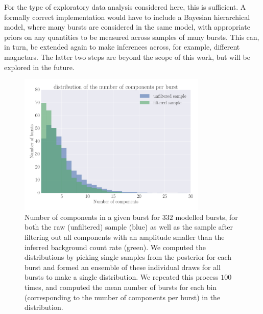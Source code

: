 \documentclass[12pt]{emulateapj}
\begin{document}
For the type of exploratory data analysis considered here, this is sufficient. A formally correct implementation would have to include a Bayesian hierarchical model,
where many bursts are considered in the same model, with appropriate priors on any quantities to be measured across samples of many bursts. This can, in turn,
be extended again to make inferences across, for example, different magnetars. The latter two steps are beyond the scope of this work, but will be explored in the future.


\begin{figure}[htbp]
\begin{center}
\includegraphics[width=9cm]{f4.pdf}%
\caption{Number of components in a given burst for $332$ modelled bursts, for both the raw (unfiltered) sample (blue) as well as the sample after
filtering out all components with an amplitude smaller than the inferred background count rate (green). We computed the distributions by picking single samples
from the posterior for each burst and formed an ensemble of these individual draws for all bursts to make a single distribution. We repeated this process $100$ times,
and computed the mean number of bursts for each bin (corresponding to the number of components per burst) in the distribution.}
\label{fig:spikes}
\end{center}
\end{figure}
\end{document}
